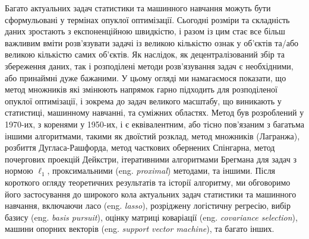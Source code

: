 Багато актуальних задач статистики та машинного навчання можуть бути сформульовані у термінах опуклої оптимізації. Сьогодні розміри та складність даних зростають з експоненційною швидкістю, і разом із цим стає все більш важливим вміти розв'язувати задачі із великою кількістю ознак у об'єктів та/або великою кількістю самих об'єктів. Як наслідок, як децентралізований збір та збереження даних, так і розподілені методи розв'язування задач є необхідними, або принаймні дуже бажаними. У цьому огляді ми намагаємося показати, що метод множників які змінюють напрямок гарно підходить для розподіленої опуклої оптимізації, і зокрема до задач великого масштабу, що виникають у статистиці, машинному навчанні, та суміжних областях. Метод був розроблений у 1970-их, з коренями у 1950-их, і є еквівалентним, або тісно пов'язаним з багатьма іншими алгоритмами, такими як двоїстий розклад, метод множників (Лагранжа), розбиття Дугласа-Рашфорда, метод часткових обернених Спінгарна, метод почергових проекцій Дейкстри, ітеративними алгоритмами Брегмана для задач з нормою $\ell_1$, проксимальними (eng. \textit{proximal}) методами, та іншими. Після короткого огляду теоретичних результатів та історії алгоритму, ми обговоримо його застосування до широкого кола актуальних задач статистики та машинного навчання, включаючи ласо (eng. \textit{lasso}), розріджену логістичну регресію, вибір базису (eng. \textit{basis pursuit}), оцінку матриці коваріації (eng. \textit{covariance selection}), машини опорних векторів (eng. \textit{support vector machine}), та багато інших. 

